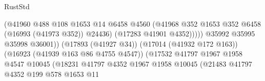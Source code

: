 \begin{lexlean}{RustStd}
\begin{coremodule}
{\begin{coremodule}
{{{{{{{{{{{{{{{{{{{{{{{{{{{{{{{{{{{{{{{{{{{{{{{{{{{{{{{                                                          (@41960
                                                            @488
                                                            @108
                                                            @1653
                                                            @14
                                                            @6458
                                                            @4560
                                                            (@41968
                                                              @352
                                                              @1653
                                                              @352
                                                              @6458
                                                              (@16993 (@41973 @352))
                                                              @24436)
                                                            (@17283 @41901 @4352)))))
                                                    @35992
                                                    @35995
                                                    @35998
                                                    @36001))
                                                (@17893 (@41927 @34))
                                                (@17014 (@41932 @172 @163))
                                                (@16923 (@41939 @163 @86 @4755 @4547))
                                                (@17532
                                                  @41797
                                                  @1967
                                                  @1958
                                                  @4547
                                                  @10045
                                                  (@18231
                                                    @41797
                                                    @4352
                                                    @1967
                                                    @1958
                                                    @10045
                                                    (@21483
                                                      @41797
                                                      @4352
                                                      @199
                                                      @578
                                                      @1653
                                                      @11
}}}}}}}}}}}}}}}}}}}}}}}}}}}}}}}}}}}}}}}}}}}}}}}}}}}}}}}
\end{coremodule}}
\end{coremodule}
\end{lexlean}
